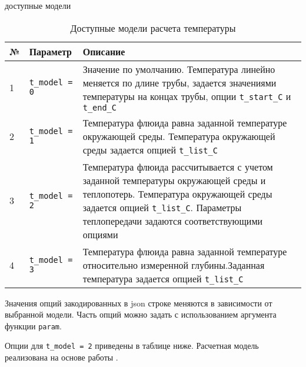
доступные модели 

\begin{table}[H]
	\caption{Доступные модели расчета температуры}
	\label{table:model_list_t_model}
	\begin{tabular}{p{}p{}p{}}
		\hline
		№& Параметр & Описание  \\ \hline
		
		1 & \texttt{t_model = 0} & Значение по умолчанию. Температура линейно меняется по длине трубы, задается значениями температуры на концах трубы, опции \texttt{t_start_C} и \texttt{t_end_C}   \\ \hline
		2 & \texttt{t_model = 1} & Температура флюида равна заданной температуре окружающей среды. Температура окружающей среды задается опцией \texttt{t_list_C}    \\ \hline
		3 & \texttt{t_model = 2} &Температура флюида рассчитывается с учетом  заданной температуры окружающей среды и теплопотерь. Температура окружающей среды задается опцией \texttt{t_list_C}. Параметры теплопередачи задаются соответствующими опциями   \\ \hline
		4 & \texttt{t_model = 3} &Температура флюида равна заданной температуре относительно измеренной глубины.Заданная температура задается опцией \texttt{t_list_C}     \\ \hline
		
	\end{tabular}
\end{table}

Значения опций закодированных в json строке меняются в зависимости от выбранной модели. Часть опций можно задать с использованием аргумента функции \texttt{param}.

Опции для \texttt{t_model = 2} приведены в таблице ниже. Расчетная модель реализована на основе работы \cite{HasanKabir_HeatTransfer_2002}.


